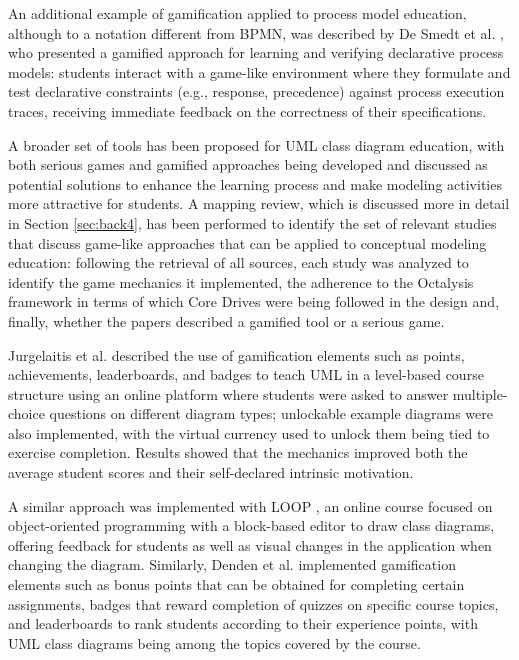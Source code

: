 An additional example of gamification applied to process model education, although to a notation different from BPMN, was described by De Smedt et al. \cite{desmedt2016gamification}, who presented a gamified approach for learning and verifying declarative process models: students interact with a game-like environment where they formulate and test declarative constraints (e.g., response, precedence) against process execution traces, receiving immediate feedback on the correctness of their specifications. 

A broader set of tools has been proposed for UML class diagram education, with both serious games and gamified approaches being developed and discussed as potential solutions to enhance the learning process and make modeling activities more attractive for students. A mapping review, which is discussed more in detail in Section \ref{sec:back4}, has been performed to identify the set of relevant studies that discuss game-like approaches that can be applied to conceptual modeling education: following the retrieval of all sources, each study was analyzed to identify the game mechanics it implemented, the adherence to the Octalysis framework in terms of which Core Drives were being followed in the design and, finally, whether the papers described a gamified tool or a serious game.

Jurgelaitis et al. \cite{jurgelaitis2019implementing} described the use of gamification elements such as points, achievements, leaderboards, and badges to teach UML in a level-based course structure using an online platform where students were asked to answer multiple-choice questions on different diagram types; unlockable example diagrams were also implemented, with the virtual currency used to unlock them being tied to exercise completion. Results showed that the mechanics improved both the average student scores and their self-declared intrinsic motivation.

A similar approach was implemented with LOOP \cite{krugel2017computational}, an online course focused on object-oriented programming with a block-based editor to draw class diagrams, offering feedback for students as well as visual changes in the application when changing the diagram. Similarly, Denden et al. \cite{denden2021effects} implemented gamification elements such as bonus points that can be obtained for completing certain assignments, badges that reward completion of quizzes on specific course topics, and leaderboards to rank students according to their experience points, with UML class diagrams being among the topics covered by the course. 



